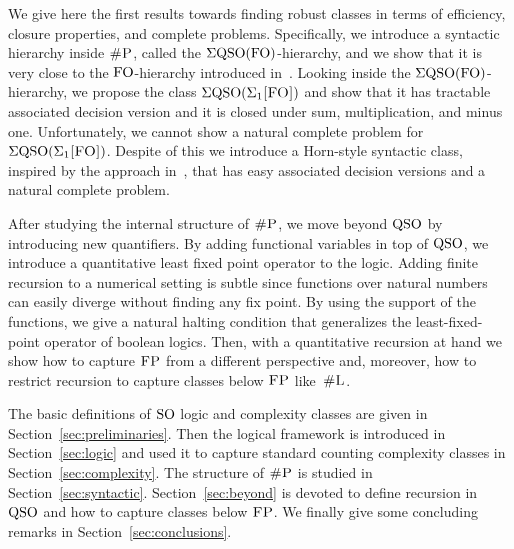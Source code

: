 We give here the first results towards finding robust classes in terms of efficiency, closure properties, and complete problems. 
Specifically, we introduce a syntactic hierarchy inside $\text{\sc \#P}$, called the $\Sigma{\rm QSO}({\rm FO})$-hierarchy, and we show that it is very close to the ${\rm FO}$-hierarchy introduced in~\cite{SalujaST95}. 
Looking inside the $\Sigma{\rm QSO}({\rm FO})$-hierarchy, we propose the class $\Sigma{\rm QSO}(\Sigma_{1}\textsc{[FO]})$ and show that it has tractable associated decision version and it is closed under sum, multiplication, and minus one. 
Unfortunately, we cannot show a natural complete problem for $\Sigma{\rm QSO}(\Sigma_{1}\textsc{[FO]})$.
Despite of this we introduce a Horn-style syntactic class, inspired by the approach in~\cite{G92}, that has easy associated decision versions and a natural complete problem.

After studying the internal structure of $\text{\sc \#P}$, we move beyond ${\rm QSO}$ by introducing new quantifiers. 
By adding functional variables in top of ${\rm QSO}$, we introduce a quantitative least fixed point operator to the logic. 
Adding finite recursion to a numerical setting is subtle since functions over natural numbers can easily diverge without finding any fix point. 
By using the support of the functions, we give a natural halting condition that generalizes the least-fixed-point operator of boolean logics. 
Then, with a quantitative recursion at hand we show how to capture $\text{\sc FP}$ from a different perspective and, moreover, how to restrict recursion to capture classes below $\text{\sc FP}$ like~$\text{\sc \#L}$. 

 The basic definitions of ${\rm SO}$ logic and complexity classes are given in Section~\ref{sec:preliminaries}. Then the logical framework is introduced in Section~\ref{sec:logic} and used it to capture standard counting complexity classes in Section~\ref{sec:complexity}. The structure of $\text{\sc \#P}$ is studied in Section~\ref{sec:syntactic}. Section~\ref{sec:beyond} is devoted to define recursion in ${\rm QSO}$ and how to capture classes below $\text{\sc FP}$. 
We finally give some concluding remarks in Section~\ref{sec:conclusions}. 
